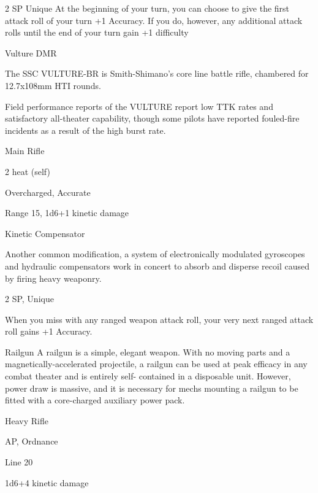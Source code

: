 2 SP
Unique
At the beginning of your turn, you can choose to give the first attack roll of your turn +1
Accuracy. If you do, however, any additional attack rolls until the end of your turn gain +1
difficulty


Vulture DMR

The SSC VULTURE-BR is Smith-Shimano’s core line battle rifle, chambered for 12.7x108mm HTI rounds.

Field performance reports of the VULTURE report low TTK rates and satisfactory all-theater capability,
though some pilots have reported fouled-fire incidents as a result of the high burst rate.

Main Rifle

2 heat (self)
 
Overcharged, Accurate

Range 15, 1d6+1 kinetic damage


Kinetic Compensator

Another common modification, a system of electronically modulated gyroscopes and hydraulic
compensators work in concert to absorb and disperse recoil caused by firing heavy weaponry.

2 SP, Unique

When you miss with any ranged weapon attack roll, your very next ranged attack roll gains +1
Accuracy.


Railgun
A railgun is a simple, elegant weapon. With no moving parts and a magnetically-accelerated
projectile, a railgun can be used at peak efficacy in any combat theater and is entirely self-
contained in a disposable unit. However, power draw is massive, and it is necessary for mechs
mounting a railgun to be fitted with a core-charged auxiliary power pack.

Heavy Rifle

AP, Ordnance

Line 20

1d6+4 kinetic damage
